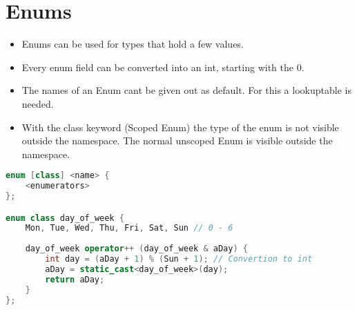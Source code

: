 
\section{Enums}
\begin{itemize}
  \itemsep -0.5em 
  \item Enums can be used for types that hold a few values.
  \item Every enum field can be converted into an int, starting with the 0. 
  \item The names of an Enum cant be given out as default. For this a lookuptable is needed.
  \item With the class keyword (Scoped Enum) the type of the enum is not visible outside the namespace. The normal unscoped Enum is visible outside the namespace.
\end{itemize}

\begin{lstlisting}[language=C++]
enum [class] <name> { 
	<enumerators>
};

enum class day_of_week {
	Mon, Tue, Wed, Thu, Fri, Sat, Sun // 0 - 6
	
	day_of_week operator++ (day_of_week & aDay) {
		int day = (aDay + 1) % (Sun + 1); // Convertion to int
		aDay = static_cast<day_of_week>(day);
		return aDay;
	}
};
\end{lstlisting}

\pagebreak



